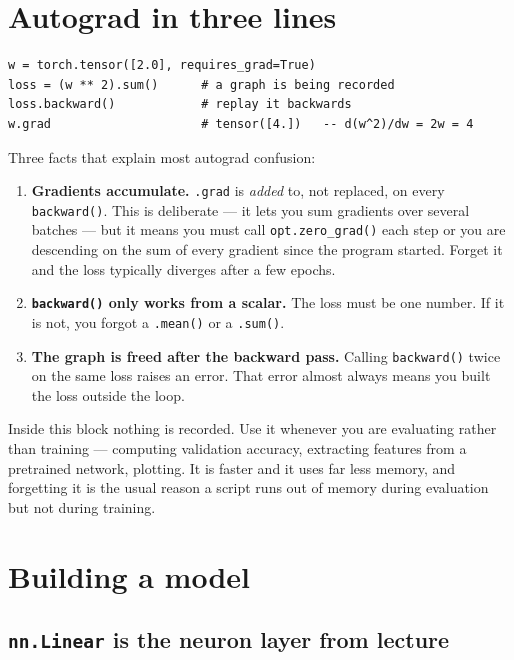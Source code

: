 \documentclass[11pt]{article}
\begin{document}
\section{Autograd in three lines}

\begin{lstlisting}
w = torch.tensor([2.0], requires_grad=True)
loss = (w ** 2).sum()      # a graph is being recorded
loss.backward()            # replay it backwards
w.grad                     # tensor([4.])   -- d(w^2)/dw = 2w = 4
\end{lstlisting}

Three facts that explain most autograd confusion:

\begin{enumerate}
  \item \textbf{Gradients accumulate.} \texttt{.grad} is \emph{added} to, not
        replaced, on every \texttt{backward()}. This is deliberate --- it lets you
        sum gradients over several batches --- but it means you must call
        \texttt{opt.zero\_grad()} each step or you are descending on the sum of
        every gradient since the program started. Forget it and the loss
        typically diverges after a few epochs.
  \item \textbf{\texttt{backward()} only works from a scalar.} The loss must be
        one number. If it is not, you forgot a \texttt{.mean()} or a
        \texttt{.sum()}.
  \item \textbf{The graph is freed after the backward pass.} Calling
        \texttt{backward()} twice on the same loss raises an error. That error
        almost always means you built the loss outside the loop.
\end{enumerate}

\begin{keybox}
 Inside this block nothing is recorded. Use it
whenever you are evaluating rather than training --- computing validation
accuracy, extracting features from a pretrained network, plotting. It is faster
and it uses far less memory, and forgetting it is the usual reason a script runs
out of memory during evaluation but not during training.
\end{keybox}

\section{Building a model}

\subsection{\texttt{nn.Linear} is the neuron layer from lecture}
\end{document}
